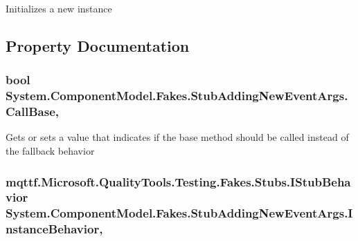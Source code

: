 Initializes a new instance



\subsection{Property Documentation}
\hypertarget{class_system_1_1_component_model_1_1_fakes_1_1_stub_adding_new_event_args_a1680d96812e73ccfb87f46a8a9a446b0}{
\subsubsection[{Call\-Base}]{\setlength{\rightskip}{0pt plus 5cm}bool System.\-Component\-Model.\-Fakes.\-Stub\-Adding\-New\-Event\-Args.\-Call\-Base\hspace{0.3cm}{\ttfamily [get]}, {\ttfamily [set]}}}\label{class_system_1_1_component_model_1_1_fakes_1_1_stub_adding_new_event_args_a1680d96812e73ccfb87f46a8a9a446b0}


Gets or sets a value that indicates if the base method should be called instead of the fallback behavior

\hypertarget{class_system_1_1_component_model_1_1_fakes_1_1_stub_adding_new_event_args_abd2bdce8f2c861c5a184033cc6b0370e}{
\subsubsection[{Instance\-Behavior}]{\setlength{\rightskip}{0pt plus 5cm}mqttf.\-Microsoft.\-Quality\-Tools.\-Testing.\-Fakes.\-Stubs.\-I\-Stub\-Behavior System.\-Component\-Model.\-Fakes.\-Stub\-Adding\-New\-Event\-Args.\-Instance\-Behavior\hspace{0.3cm}{\ttfamily [get]}, {\ttfamily [set]}}}\label{class_system_1_1_component_model_1_1_fakes_1_1_stub_adding_new_event_args_abd2bdce8f2c861c5a184033cc6b0370e}


